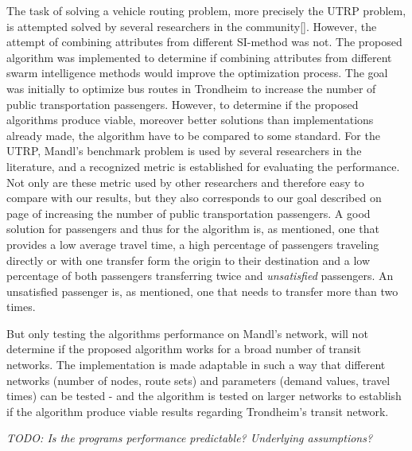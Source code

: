 
The task of solving a vehicle routing problem, more precisely the UTRP problem, is attempted solved by several researchers in the community[]. However, the attempt of combining attributes from different SI-method was not. The proposed algorithm was implemented to determine if combining attributes from different swarm intelligence methods would improve the optimization process. The goal was initially to optimize bus routes in Trondheim to increase the number of public transportation passengers. However, to determine if the proposed algorithms produce viable, moreover better solutions than implementations already made, the algorithm have to be compared to some standard. For the UTRP, Mandl's benchmark problem is used by several researchers in the literature, and a recognized metric is established for evaluating the performance.  Not only are these metric used by other researchers and therefore easy to compare with our results, but they also corresponds to our goal described on page \pageref{itm:goal} of increasing the number of public transportation passengers. A good solution for  passengers and thus for the algorithm is, as mentioned, one that provides a low average travel time, a high percentage of passengers traveling directly or with one transfer form the origin to their destination and a low percentage of both passengers transferring twice and \textit{unsatisfied} passengers. An unsatisfied passenger is, as mentioned, one that needs to transfer more than two times. 

But only testing the algorithms performance on Mandl's network, will not determine if the proposed algorithm works for a broad number of transit networks. The implementation is made adaptable in such a way that different networks (number of nodes, route sets) and parameters (demand values, travel times) can be tested - and the algorithm is tested on larger networks to establish if the algorithm produce viable results regarding Trondheim's transit network.

\emph{\color{blue}TODO: Is the programs performance predictable? Underlying assumptions?}